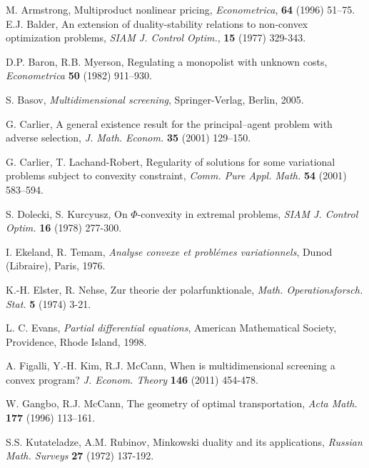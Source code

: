 \documentclass[a4paper, 11pt]{amsart}
\numberwithin{equation}{section}
\theoremstyle{plain}
\theoremstyle{definition}
\theoremstyle{remark}
\begin{document}
\begin{thebibliography}{BCDE}
	
{	 
	M. Armstrong, 
	Multiproduct nonlinear pricing, 
	{\em Econometrica}, {\bf 64 }(1996) 51–75.
}	
		E.J. Balder, 
		An extension of duality-stability relations to non-convex optimization problems, 
		{\em SIAM J. Control Optim.}, {\bf 15} (1977) 329-343.
	
	D.P. Baron, R.B. Myerson, 
	Regulating a monopolist with unknown costs, 
	{\em Econometrica} {\bf 50} (1982) 911–930.
	
	S. Basov, 
	{\em Multidimensional screening}, 
	Springer-Verlag, Berlin, 2005.
	
	G. Carlier, 
	A general existence result for the principal–agent problem with adverse selection, 
	{\em J. Math. Econom.} {\bf 35} (2001) 129–150.
	
	G. Carlier, T. Lachand-Robert, 
	Regularity of solutions for some variational problems subject to convexity constraint, 
	{\em Comm. Pure Appl. Math.} {\bf 54} (2001) 583–594.
	
{	 
	S. Dolecki, S. Kurcyusz, 
	On $\Phi$-convexity in extremal problems, 
	{\em SIAM J. Control Optim.} {\bf 16} (1978)  277-300.
}

	I. Ekeland, R. Temam,
	 {\em Analyse convexe et probl\'emes variationnels},
	 Dunod (Libraire), Paris, 1976.

{
	K.-H. Elster, R. Nehse, 
	Zur theorie der polarfunktionale, 
	{\em Math. Operationsforsch. Stat.} {\bf 5} (1974) 3-21.
}

	L. C. Evans, 
	{\em Partial differential equations},
	American Mathematical Society, Providence, Rhode Island, 1998.
	

	A. Figalli, Y.-H. Kim, R.J. McCann, 
	When is multidimensional screening a convex program? 
	{\em J. Econom. Theory} {\bf 146} (2011) 454-478.
	
{	 
	W. Gangbo, R.J. McCann, 
	The geometry of optimal transportation, 
	{\em Acta Math.} {\bf 177} (1996) 113–161.
}
	

{
	S.S. Kutateladze, A.M. Rubinov, 
	Minkowski duality and its applications, 
	{\em Russian Math. Surveys} {\bf 27}  (1972) 137-192.
}


\end{thebibliography}
\end{document}
